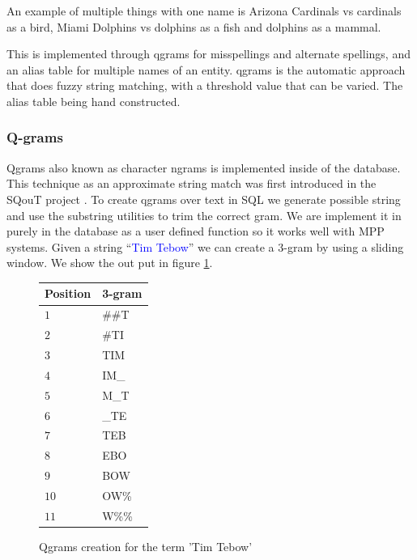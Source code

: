 \documentclass[11pt,onecolumn]{article}
\begin{document}
    An example of multiple things with one name is
    Arizona Cardinals vs cardinals as a bird,
    Miami Dolphins vs dolphins as a fish and dolphins as a mammal.

    This is implemented through qgrams for misspellings and alternate spellings,
    and an alias table for multiple names of an entity.
    qgrams is the automatic approach that does fuzzy string matching,
    with a threshold value that can be varied.
    The alias table being hand constructed.


    \subsubsection{Q-grams}
    \label{qgram}

		Qgrams also known as character ngrams is implemented inside of the database.
		This technique as an approximate string match was first introduced in the 
		SQouT project \cite{Jain:2009:BQO:1519103.1519108}.
		To create qgrams over text in SQL we generate possible string and use the 
	substring utilities to trim the correct gram.
		We are implement it in purely in the database as a user defined function
		 so it works well with MPP systems.
		Given a string ``\textcolor{blue}{Tim Tebow}'' we can create a 3-gram by 
		using a sliding window. We show the out put in figure \ref{tab:qgramoutput}.
	
		\begin{figure}	
\begin{center}
		\begin{tabular}{|l|l|}
		\hline
		\textbf{Position} & \textbf{3-gram} \\
		\hline
		$1$ & \#\#T \\
		\hline
		$2$ & \#TI \\
		\hline
		$3$ & TIM \\
		\hline
		$4$ & IM\_ \\
		\hline
		$5$ & M\_T \\
		\hline
		$6$ & \_TE \\
		\hline
		$7$ & TEB \\
		\hline
		$8$ & EBO \\
		\hline
		$9$ & BOW \\
		\hline
		$10$ & OW\% \\
		\hline
		$11$ & W\%\% \\
		\hline
		\end{tabular}
\end{center}
\caption{Qgrams creation for the term 'Tim Tebow'}
\label{tab:qgramoutput}
		\end{figure}
\end{document}
